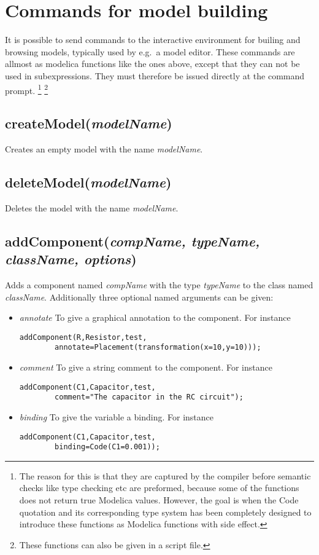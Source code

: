 \documentclass{report}
\newcommand{\func}[1]{\section{#1}}
\newcommand{\funcbegin}{}
\begin{document}
\chapter{Commands for model building}
It is possible to send commands to the interactive environment for
builing and browsing models, typically used by e.g.\ a model
editor. These commands are allmost as modelica functions like the ones
above, except that they can not be used in subexpressions. They must
therefore be issued directly at the command prompt. \footnote{The reason for
this is that they are captured by the compiler before semantic checks
like type checking etc are preformed, because some of the functions
does not return true Modelica values. However, the goal is when the
Code quotation and its corresponding type system has been completely
designed to introduce these functions as Modelica functions with side
effect.} 
\footnote{These functions can also be given in a script file.}

\funcbegin

\func{createModel(\emph{modelName})}
Creates an empty model with the name \emph{modelName}.

\func{deleteModel(\emph{modelName})}
Deletes the model with the name \emph{modelName}.

\func{addComponent(\emph{compName, typeName, className, options})}
Adds a component named \emph{compName} with the type \emph{typeName}
to the class named \emph{className}. Additionally three optional named
arguments can be given:
\begin{itemize}
\item{\emph{annotate}} To give a graphical annotation to the
component. For instance
\begin{verbatim}
addComponent(R,Resistor,test, 
        annotate=Placement(transformation(x=10,y=10)));
\end{verbatim}
\item{\emph{comment}} To give a string comment to the component.
For instance
\begin{verbatim}
addComponent(C1,Capacitor,test,
        comment="The capacitor in the RC circuit");
\end{verbatim}
\item{\emph{binding}} To give the variable a binding.
For instance
\begin{verbatim}
addComponent(C1,Capacitor,test,
        binding=Code(C1=0.001));
\end{verbatim}
\end{itemize}
\end{document}
